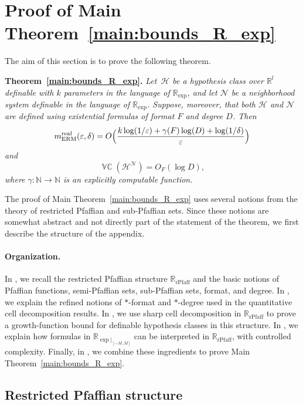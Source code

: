 \documentclass[11pt]{article}
\theoremstyle{plain}
\theoremstyle{definition}
\theoremstyle{remark}
\newenvironment{restatedtheorem}[1]
  {\par\noindent\textbf{Theorem~\ref{#1}.}\itshape}
  {\par}
\DeclareMathOperator{\VCdim}{\mathbb{VC}}
\newcommand{\R}{\mathbb{R}}
\newcommand{\rPfaff}{\operatorname{rPfaff}}
\begin{document}
\section{Proof of Main Theorem~\ref{main:bounds_R_exp}}
\label{app:sec:proof-main:bounds_R_exp}

The aim of this section is to prove the following theorem.

\begin{restatedtheorem}{main:bounds_R_exp}
Let~$\mathcal H$ be a hypothesis class over $\mathbb R^l$ definable with $k$ parameters in the language of $\mathbb R_{\exp}$, and let $\mathcal N$ be a neighborhood system definable in the language of $\mathbb R_{\exp}$. Suppose, moreover, that both $\mathcal H$ and $\mathcal N$ are defined using existential formulas of format $F$ and degree $D$. Then
\[
  m_{\mathrm{ERM}}^{\mathrm{real}}(\varepsilon,\delta)=  O\Bigl(\frac{k\log(1/\varepsilon) + \gamma(F) \log(D) + \log(1/\delta)}{\varepsilon}\Bigr)
\]
and
\[
\VCdim(\mathcal H^\mathcal N)  = O_F(\log D),
\]
where $\gamma\colon \mathbb N \to \mathbb N$ is an explicitly computable function.
\end{restatedtheorem}


The proof of Main Theorem~\ref{main:bounds_R_exp} uses several notions from the
theory of restricted Pfaffian and sub-Pfaffian sets. Since these notions are
somewhat abstract and not directly part of the statement of the theorem, we
first describe the structure of the appendix.

\paragraph{Organization.} In , we recall the restricted Pfaffian
structure \(\R_{\rPfaff}\) and the basic notions of Pfaffian functions,
semi-Pfaffian sets, sub-Pfaffian sets, format, and degree. In
, we explain the refined notions of
\(*\)-format and \(*\)-degree used in the quantitative cell decomposition
results. In , we use sharp cell decomposition
in \(\R_{\rPfaff}\) to prove a growth-function bound for definable hypothesis
classes in this structure. In , we explain how
formulas in \(\R_{\exp|_{[-M,M]}}\) can be interpreted in
\(\R_{\rPfaff}\), with controlled complexity. Finally, in
, we combine these ingredients to prove
Main Theorem~\ref{main:bounds_R_exp}.

\subsection{Restricted Pfaffian structure}
\label{app:restricted-definition}
\end{document}
